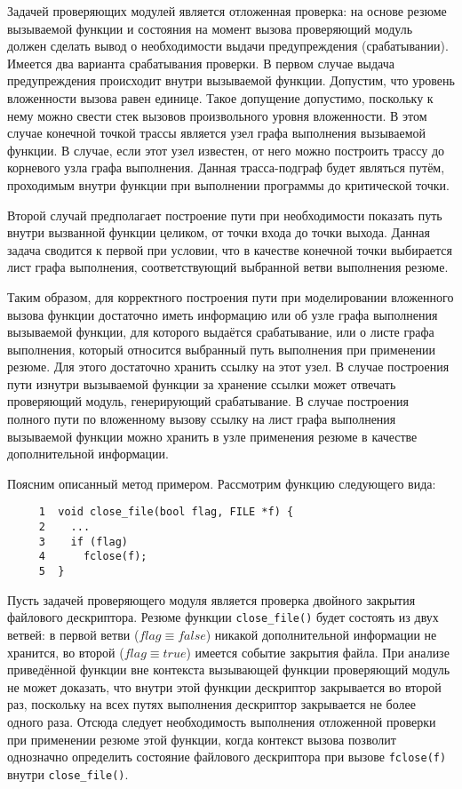 Задачей проверяющих модулей является отложенная проверка: на основе резюме вызываемой функции и состояния на момент вызова проверяющий модуль должен сделать вывод о необходимости выдачи предупреждения (срабатывании). Имеется два варианта срабатывания проверки. В первом случае выдача предупреждения происходит внутри вызываемой функции. Допустим, что уровень вложенности вызова равен единице. Такое допущение допустимо, поскольку к нему можно свести стек вызовов произвольного уровня вложенности. В этом случае конечной точкой трассы является узел графа выполнения вызываемой функции. В случае, если этот узел известен, от него можно построить трассу до корневого узла графа выполнения. Данная трасса-подграф будет являться путём, проходимым внутри функции при выполнении программы до критической точки.

Второй случай предполагает построение пути при необходимости показать путь внутри вызванной функции целиком, от точки входа до точки выхода. Данная задача сводится к первой при условии, что в качестве конечной точки выбирается лист графа выполнения, соответствующий выбранной ветви выполнения резюме.

Таким образом, для корректного построения пути при моделировании вложенного вызова функции достаточно иметь информацию или об узле графа выполнения вызываемой функции, для которого выдаётся срабатывание, или о листе графа выполнения, который относится выбранный путь выполнения при применении резюме. Для этого достаточно хранить ссылку на этот узел. В случае построения пути изнутри вызываемой функции за хранение ссылки может отвечать проверяющий модуль, генерирующий срабатывание. В случае построения полного пути по вложенному вызову ссылку на лист графа выполнения вызываемой функции можно хранить в узле применения резюме в качестве дополнительной информации.

Поясним описанный метод примером. Рассмотрим функцию следующего вида:

\begin{verbatim}
     1  void close_file(bool flag, FILE *f) {
     2    ...
     3    if (flag)
     4      fclose(f);
     5  }
\end{verbatim}

Пусть задачей проверяющего модуля является проверка двойного закрытия файлового дескриптора. Резюме функции \texttt{close\_file()} будет состоять из двух ветвей: в первой ветви ($flag \equiv false$) никакой дополнительной информации не хранится, во второй ($flag \equiv true$) имеется событие закрытия файла. При анализе приведённой функции вне контекста вызывающей функции проверяющий модуль не может доказать, что внутри этой функции дескриптор закрывается во второй раз, поскольку на всех путях выполнения дескриптор закрывается не более одного раза. Отсюда следует необходимость выполнения отложенной проверки при применении резюме этой функции, когда контекст вызова позволит однозначно определить состояние файлового дескриптора при вызове \texttt{fclose(f)} внутри \texttt{close\_file()}.

